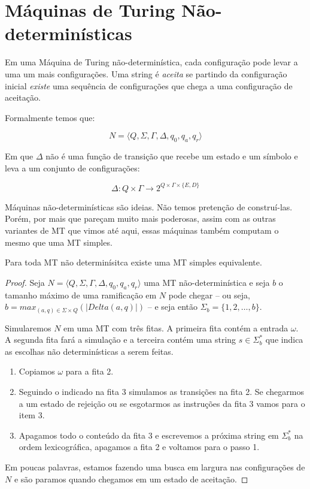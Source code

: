\section{Máquinas de Turing Não-determinísticas}
\label{sec:mt-nd}

Em uma Máquina de Turing não-determinística, cada configuração pode levar a uma um mais configurações.
Uma string é {\em aceita} se partindo da configuração inicial {\em existe} uma sequência de configurações que chega a uma configuração de aceitação.

Formalmente temos que:

\begin{displaymath}
  N = \langle Q, \Sigma, \Gamma, \Delta, q_0, q_a, q_r \rangle
\end{displaymath}

Em que $\Delta$ não é uma função de transição que recebe um estado e um símbolo e leva a um conjunto de configurações:

\begin{displaymath}
  \Delta : Q \times \Gamma \to 2^{Q \times \Gamma \times \{E,D\}}
\end{displaymath}

Máquinas não-determinísticas são ideias.
Não temos pretenção de construí-las.
Porém, por mais que pareçam muito mais poderosas, assim com as outras variantes de MT que vimos até aqui, essas máquinas também computam o mesmo que uma MT simples.

\begin{theorem}
  Para toda MT não determinísitca existe uma MT simples equivalente.
\end{theorem}
\begin{proof}
  Seja $N = \langle Q, \Sigma, \Gamma, \Delta, q_0, q_a, q_r \rangle$ uma MT não-determinística e seja $b$ o tamanho máximo de uma ramificação em $N$ pode chegar -- ou seja, $b = max_{(a,q) \in \Sigma \times Q}(|Delta(a,q)|)$ -- e seja então $\Sigma_b = \{1,2, \dots, b\}$.
  
  Simularemos $N$ em uma MT com três fitas.
  A primeira fita contém a entrada $\omega$.
  A segunda fita fará a simulação e a terceira contém uma string $s \in \Sigma_b^*$ que indica as escolhas não determinísticas a serem feitas.
  \begin{enumerate}
  \item Copiamos $\omega$ para a fita 2.
  \item Seguindo o indicado na fita 3 simulamos as transições na fita 2.
    Se chegarmos a um estado de rejeição ou se esgotarmos as instruções da fita 3 vamos para o item 3.
  \item Apagamos todo o conteúdo da fita 3 e escrevemos a próxima string em $\Sigma_b^*$ na ordem lexicográfica, apagamos a fita 2 e voltamos para o passo 1.
  \end{enumerate}

  Em poucas palavras, estamos fazendo uma busca em largura nas configurações de $N$ e são paramos quando chegamos em um estado de aceitação.
\end{proof}

